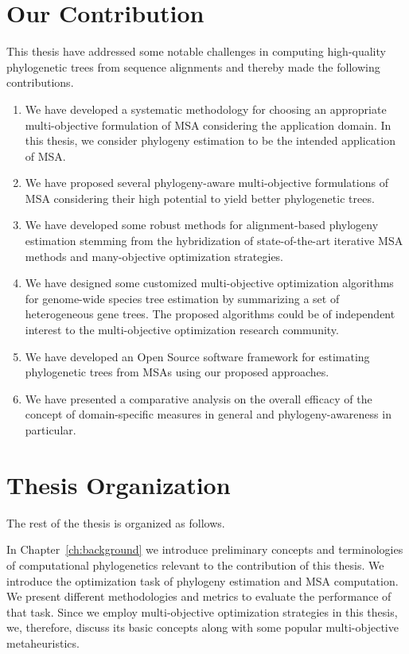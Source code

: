 \section{Our Contribution}
This thesis have addressed some notable challenges in computing high-quality phylogenetic trees from sequence alignments and thereby made the following contributions.

\begin{enumerate}
\item We have developed a systematic methodology for choosing an appropriate multi-objective formulation of MSA considering the application domain. In this thesis, we consider phylogeny estimation to be the intended application of MSA.

\item We have proposed several phylogeny-aware multi-objective formulations of MSA considering their high potential to yield better phylogenetic trees.

\item We have developed some robust methods for alignment-based phylogeny estimation stemming from the hybridization of state-of-the-art iterative MSA methods and many-objective optimization strategies. 

\item We have designed some customized multi-objective optimization algorithms for genome-wide species tree estimation by summarizing a set of heterogeneous gene trees. The proposed algorithms could be of independent interest to the multi-objective optimization research community.

\item We have developed an Open Source software framework for estimating phylogenetic trees from MSAs using our proposed approaches.

\item We have presented a comparative analysis on the overall efficacy of the concept of domain-specific measures in general and phylogeny-awareness in particular.
\end{enumerate}


\section{Thesis Organization}

The rest of the thesis is organized as follows.

In Chapter~\ref{ch:background} we introduce preliminary concepts and terminologies of computational phylogenetics
relevant to the contribution of this thesis. We introduce the optimization task of phylogeny estimation and MSA computation. We present different methodologies and metrics to evaluate the performance of that task. Since we employ multi-objective optimization strategies in this thesis, we, therefore, discuss its basic concepts along with some popular multi-objective metaheuristics.

